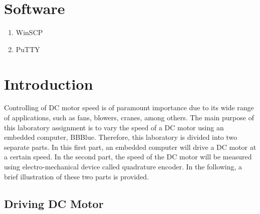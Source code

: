 \section{Software}
\begin{enumerate}
    \item WinSCP
    \item PuTTY
\end{enumerate}



\section{Introduction}
\label{sec:introductionDC-MotorModeling}
Controlling of DC motor speed is of paramount importance due to its wide range of applications, such as fans, blowers, cranes, among others. The main purpose of this laboratory assignment is to vary the speed of a DC motor using an embedded computer, BBBlue. Therefore, this laboratory is divided into two separate parts. In this first part, an embedded computer will drive a DC motor at a certain speed. In the second part, the speed of the DC motor will be measured using electro-mechanical device called quadrature encoder. In the following, a brief illustration of these two parts is provided. 

\subsection{Driving DC Motor}


